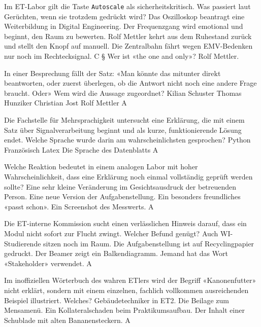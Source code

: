 
Im ET-Labor gilt die Taste \texttt{Autoscale} als sicherheitskritisch. Was passiert laut Gerüchten, wenn sie trotzdem gedrückt wird?
{Das Oszilloskop beantragt eine Weiterbildung in Digital Engineering.}
{Der Frequenzgang wird emotional und beginnt, den Raum zu bewerten.}
{Rolf Mettler kehrt aus dem Ruhestand zurück und stellt den Knopf auf manuell.}
{Die Zentralbahn fährt wegen EMV-Bedenken nur noch im Rechtecksignal.}
{C}
§
Wer ist «the one and only»?
{Rolf Mettler.}

In einer Besprechung fällt der Satz: «Man könnte das mitunter direkt
beantworten, oder zuerst überlegen, ob die Antwort nicht noch eine
andere Frage braucht. Oder» Wem wird die Aussage zugeordnet?
{Kilian Schuster}
{Thomas Hunziker}
{Christian Jost}
{Rolf Mettler}
{A}

Die Fachstelle für Mehrsprachigkeit untersucht eine Erklärung, die mit einem
Satz über Signalverarbeitung beginnt und als kurze, funktionierende Lösung
endet. Welche Sprache wurde darin am wahrscheinlichsten gesprochen?
{Python}
{Französisch}
{Latex}
{Die Sprache des Datenblatts}
{A}

Welche Reaktion bedeutet in einem analogen Labor mit hoher Wahrscheinlichkeit,
dass eine Erklärung noch einmal vollständig geprüft werden sollte?
{Eine sehr kleine Veränderung im Gesichtsausdruck der betreuenden Person.}
{Eine neue Version der Aufgabenstellung.}
{Ein besonders freundliches «passt schon».}
{Ein Screenshot des Messwerts.}
{A}


Die ET-interne Kommission sucht einen verlässlichen Hinweis darauf, dass ein
Modul nicht sofort zur Flucht zwingt. Welcher Befund genügt?
{Auch WI-Studierende sitzen noch im Raum.}
{Die Aufgabenstellung ist auf Recyclingpapier gedruckt.}
{Der Beamer zeigt ein Balkendiagramm.}
{Jemand hat das Wort «Stakeholder» verwendet.}
{A}

Im inoffiziellen Wörterbuch des wahren ETlers wird der Begriff
«Kanonenfutter» nicht erklärt, sondern mit einem einzelnen, fachlich
vollkommen ausreichenden Beispiel illustriert. Welches?
{Gebäudetechniker in ET2.}
{Die Beilage zum Mensamenü.}
{Ein Kollateralschaden beim Praktikumsaufbau.}
{Der Inhalt einer Schublade mit alten Bananensteckern.}
{A}

